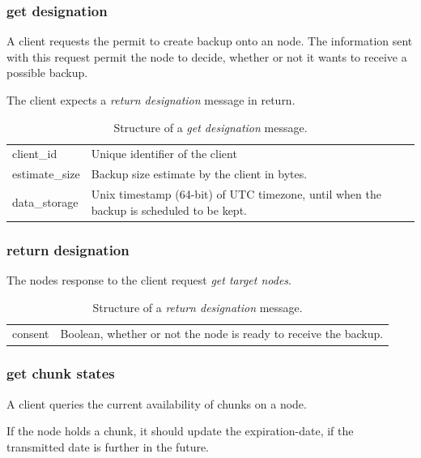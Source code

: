 \subsubsection{get designation}
A \gls{client} requests the permit to create backup onto an \gls{node}. The information sent with this request permit the \gls{node} to decide, whether or not it wants to receive a possible backup.

The client expects a \emph{return designation} \gls{message} in return.

\begin{table}[h!]
    \begin{tabu}{| >{\ttfamily}l | X |}
        client\_id
            & Unique identifier of the \gls{client} \\
        estimate\_size
            & Backup size estimate by the \gls{client} in bytes. \\
        data\_storage
            & Unix timestamp (64-bit) of UTC timezone, until when the backup is scheduled to be kept.
    \end{tabu}
    \caption[\emph{get designaton} Structure]{Structure of a \emph{get designation} \Gls{message}.}
    \label{tab:message-get-designation}
\end{table}

\subsubsection{return designation}
The \glspl{node} response to the \gls{client} request \emph{get target nodes}.
\begin{table}[h!]
    \begin{tabu}{| >{\ttfamily}l | X |}
        consent
            & Boolean, whether or not the node is ready to receive the backup.
    \end{tabu}
    \caption[\emph{return designaton} Structure]{Structure of a \emph{return designation} \Gls{message}.}
    \label{tab:message-return-designation}
\end{table}

\subsubsection{get chunk states}
A \gls{client} queries the current availability of \glspl{chunk} on a \gls{node}.

If the \gls{node} holds a \gls{chunk}, it should update the \gls{expiration-date}, if the transmitted date is further in the future.


